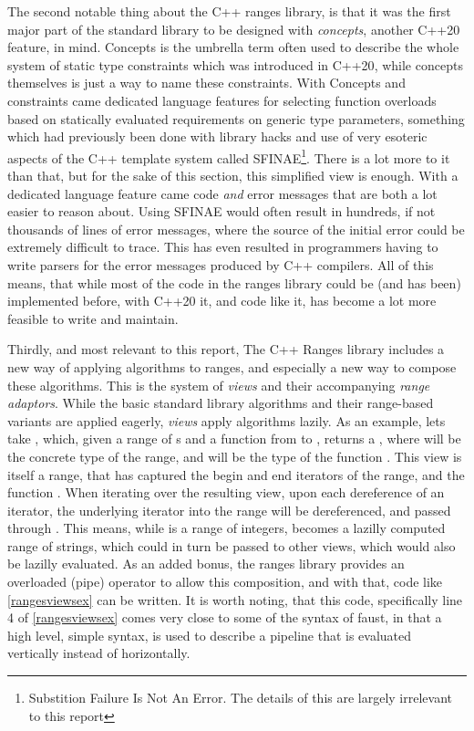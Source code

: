 The second notable thing about the C++ ranges library, is that it was the first major part of the standard
library to be designed with \emph{concepts}, another C++20 feature\autocite{N4674}, in mind.
Concepts is the umbrella term often used to describe the whole system of static type constraints which was
introduced in C++20\autocite{P0724R0}, while concepts themselves is just a way to name these constraints.
With Concepts and constraints came dedicated language features for selecting function overloads based on
statically evaluated requirements on generic type parameters, something which had previously been done with
library hacks  and use of very esoteric aspects of the C++ template system called
SFINAE\footnote{Substition Failure Is Not An Error. The details of this are largely irrelevant to this report}. There is a lot more to it than that, but for the sake of this section, this
simplified view is enough. With a dedicated language feature came code \emph{and} error messages
that are both a lot easier to reason about. Using SFINAE would often result in hundreds, if not thousands of
lines of error messages, where the source of the initial error could be extremely difficult to trace. This
has even resulted in programmers having to write parsers for the error messages produced by C++
compilers\autocite{Raz2019}. All of this means, that while most of the code in the ranges library could
be (and has been\autocite{range-v3}) implemented before, with C++20 it, and code like it, has become a lot
more feasible to write and maintain.

Thirdly, and most relevant to this report, The C++ Ranges library includes a new way of applying algorithms
to ranges, and especially a new way to compose these algorithms. This is the system of \emph{views}
and their accompanying \emph{range adaptors}. While the basic standard library algorithms and their
range-based variants are applied eagerly, \emph{views} apply algorithms lazily. As an example, lets
take , which, given a range of s and a function from  to  , returns a
, where  will be the concrete type of the  range, and  will be the type of the
function . This view is itself a range, that has captured the begin and end iterators of the range, and the function . When iterating over the resulting view, upon each dereference of
an iterator, the underlying iterator into the  range will be dereferenced, and passed through . This means, while
 is a range of integers,  becomes a lazilly computed range of strings,
which could in turn be passed to other views, which would also be lazilly evaluated. As an added bonus, the
ranges library provides an overloaded \cpp{|} (pipe) operator to allow this composition, and with that, code like \autoref{rangesviewsex} can be written. It is worth
noting, that this code, specifically line 4 of \autoref{rangesviewsex} comes very close to some of the syntax
of faust, in that a high level, simple syntax, is used to describe a pipeline that is evaluated vertically
instead of horizontally.

